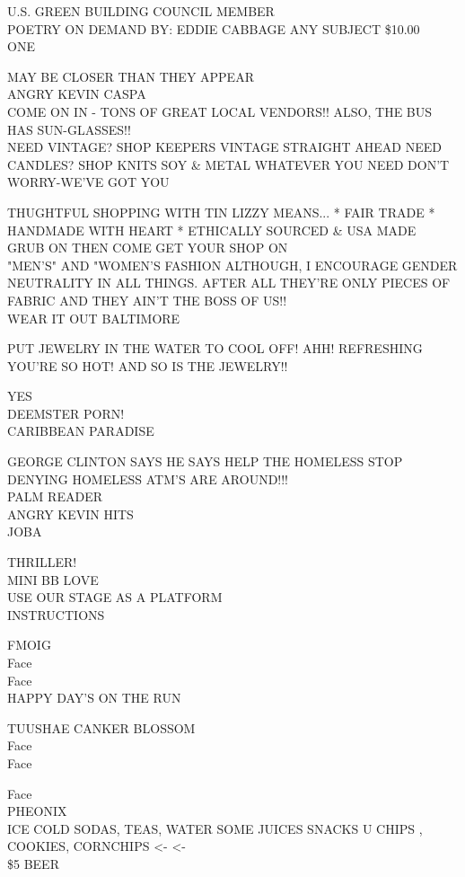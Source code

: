 \documentclass[10pt,letterpaper]{article}
\begin{document}
U.S. GREEN BUILDING COUNCIL MEMBER\\
POETRY ON DEMAND BY: EDDIE CABBAGE ANY SUBJECT \$10.00\\
ONE

MAY BE CLOSER THAN THEY APPEAR\\
ANGRY KEVIN CASPA\\
COME ON IN {-} TONS OF GREAT LOCAL VENDORS!! ALSO, THE BUS HAS SUN{-}GLASSES!!\\
NEED VINTAGE?  SHOP KEEPERS VINTAGE STRAIGHT AHEAD NEED CANDLES? SHOP KNITS SOY \& METAL WHATEVER YOU NEED DON'T WORRY{-}WE'VE GOT YOU

THUGHTFUL SHOPPING WITH TIN LIZZY MEANS... * FAIR TRADE * HANDMADE WITH HEART * ETHICALLY SOURCED \& USA MADE\\
GRUB ON THEN COME GET YOUR SHOP ON\\
"MEN'S" AND "WOMEN'S  FASHION ALTHOUGH, I ENCOURAGE GENDER NEUTRALITY IN ALL THINGS.  AFTER ALL THEY'RE ONLY PIECES OF FABRIC AND THEY AIN'T THE BOSS OF US!!\\
WEAR IT OUT BALTIMORE

PUT JEWELRY IN THE WATER TO COOL OFF!  AHH!  REFRESHING\\
YOU'RE SO HOT!  AND SO IS THE JEWELRY!!

YES\\
DEEMSTER PORN!\\
CARIBBEAN PARADISE

GEORGE CLINTON SAYS HE SAYS HELP THE HOMELESS STOP DENYING HOMELESS ATM'S ARE AROUND!!!\\
PALM READER\\
ANGRY KEVIN HITS\\
JOBA

THRILLER!\\
MINI BB LOVE\\
USE OUR STAGE AS A PLATFORM\\
INSTRUCTIONS

FMOIG\\
Face\\
Face\\
HAPPY DAY'S ON THE RUN

TUUSHAE CANKER BLOSSOM\\
Face\\
Face

Face\\
PHEONIX\\
ICE COLD SODAS, TEAS, WATER SOME JUICES SNACKS U CHIPS , COOKIES, CORNCHIPS <{-} <{-}\\
\$5 BEER
\end{document}
